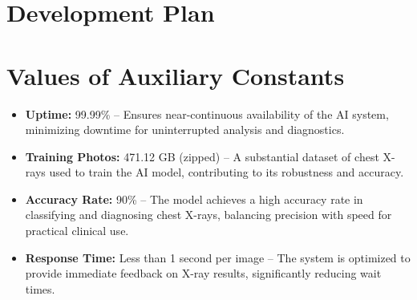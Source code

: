 \documentclass[12pt]{article}
\begin{document}



\section{Development Plan}


\section{Values of Auxiliary Constants}

\begin{itemize}
    \item \textbf{Uptime:} 99.99\% – Ensures near-continuous availability of the AI system, minimizing downtime for uninterrupted analysis and diagnostics.
    \item \textbf{Training Photos:} 471.12 GB (zipped) – A substantial dataset of chest X-rays used to train the AI model, contributing to its robustness and accuracy.
    \item \textbf{Accuracy Rate:} 90\% – The model achieves a high accuracy rate in classifying and diagnosing chest X-rays, balancing precision with speed for practical clinical use.
    \item \textbf{Response Time:} Less than 1 second per image – The system is optimized to provide immediate feedback on X-ray results, significantly reducing wait times.
\end{itemize}
\end{document}
